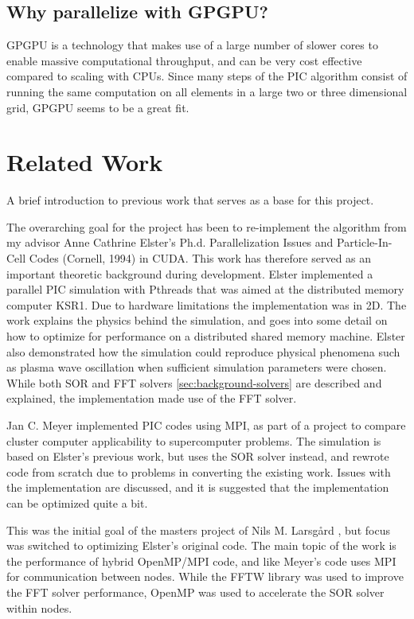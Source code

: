 \subsection{Why parallelize with GPGPU?}
GPGPU is a technology that makes use of a large number of slower cores to enable massive computational throughput, and
can be very cost effective compared to scaling with CPUs. Since many steps of the PIC algorithm consist of running the
same computation on all elements in a large two or three dimensional grid, GPGPU seems to be a great fit.

\section{Related Work}
A brief introduction to previous work that serves as a base for this project.

The overarching goal for the project has been to re-implement the algorithm from my advisor Anne Cathrine Elster's Ph.d.
Parallelization Issues and Particle-In-Cell Codes (Cornell, 1994) \cite{elster94} in CUDA. This work has therefore served
as an important theoretic background during development. Elster implemented a parallel PIC simulation with Pthreads
that was aimed at the distributed memory computer KSR1. Due to hardware limitations the implementation was in 2D.
The work explains the physics behind the simulation, and goes into some detail on how to optimize for performance on a
distributed shared memory machine. Elster also demonstrated how the simulation could reproduce physical phenomena such as
plasma wave oscillation when sufficient simulation parameters were chosen. While both SOR and FFT solvers \ref{sec:background-solvers}
are described and explained, the implementation made use of the FFT solver.

Jan C. Meyer \cite{meyer04} implemented PIC codes using MPI, as part of a project to compare cluster computer applicability to
supercomputer problems. The simulation is based on Elster's previous work, but uses the SOR solver instead, and rewrote
code from scratch due to problems in converting the existing work. Issues with the implementation are discussed, and it
is suggested that the implementation can be optimized quite a bit.

This was the initial goal of the masters project of Nils M. Larsgård \cite{larsgaard07}, but focus was switched to
optimizing Elster's original code. The main topic of the work is the performance of hybrid OpenMP/MPI code, and like
Meyer's code uses MPI for communication between nodes. While the FFTW library was used to improve the FFT solver
performance, OpenMP was used to accelerate the SOR solver within nodes.


